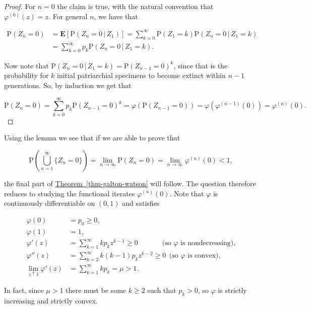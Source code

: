 \documentclass[11pt]{report}
\theoremstyle{plain}
\theoremstyle{definition}
\begin{document}
\begin{proof}
For $n=0$ the claim is true, with the natural
convention that $\varphi^{(0)}(z)=z$. For general $n$,
we have that

\begin{align*}
\mathrm{P}(Z_n = 0) &= \mathbf{E}\left[ \mathrm{P}\left( Z_n=0\,|\,Z_1 \right) \right] = \sum_{k=0}^\infty \mathrm{P}(Z_1=k) \mathrm{P}\left(Z_n=0\,|\,Z_1=k\right) \\
&= \sum_{k=0}^\infty p_k \mathrm{P}\left(Z_n=0\,|\,Z_1=k\right).
\end{align*}

\noindent Now note that
$\mathrm{P}\left(Z_n=0\,|\,Z_1=k\right)=\mathrm{P}(Z_{n-1}=0)^k$,
since that is the probability for $k$ initial
patriarchial specimens to become extinct within $n-1$
generations. So, by induction we get that

\[
\mathrm{P}(Z_n=0) = \sum_{k=0}^\infty p_k \mathrm{P}(Z_{n-1}=0)^k = \varphi(\mathrm{P}(Z_{n-1}=0)) = \varphi(\varphi^{(n-1)}(0))
= \varphi^{(n)}(0).
\]

\end{proof}

\noindent Using the lemma we see that if we are able to prove
that

\[
\mathrm{P}\left(\bigcup_{n=1}^\infty \{Z_n=0\}\right)= \lim_{n\to\infty} \mathrm{P}(Z_n=0) = \lim_{n\to\infty} \varphi^{(n)}(0)<1,
\]

\noindent the final part of \hyperref[thm-galton-watson]{Theorem~\ref*{thm-galton-watson}} will
follow. The question therefore reduces to studying the
functional iterates $\varphi^{(n)}(0)$. Note that
$\varphi$ is continuously differentiable on $(0,1)$
and satisfies

\begin{align*}
\varphi(0) &= p_0 \ge 0, \\
\varphi(1) &=1, \\
\varphi'(z) &= \sum_{k=1}^\infty k p_k z^{k-1} \ge 0 \qquad\quad\  \ \textrm{(so $\varphi$ is nondecreasing),}\\
\varphi''(z) &= \sum_{k=2}^\infty k(k-1) p_k z^{k-2} \ge 0 \ \ \textrm{(so $\varphi$ is convex)}, \\
\lim_{z\uparrow 1} \varphi'(z) &= \sum_{k=1}^\infty k p_k = \mu > 1.
\end{align*}

\noindent In fact, since $\mu>1$ there must be some $k\ge 2$
such that $p_k>0$, so $\varphi$ is strictly
increasing and strictly convex.
\end{document}
